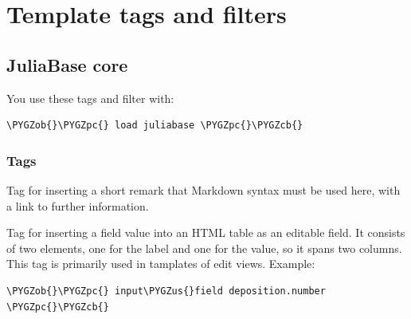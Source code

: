 \documentclass[a4paper,11pt,english]{sphinxmanual}
\def\PYGZus{\char`\_}
\def\PYGZob{\char`\{}
\def\PYGZcb{\char`\}}
\def\PYGZpc{\char`\%}
\begin{document}

\chapter{Template tags and filters}
\label{programming/template_tags_and_filters:index-0}\label{programming/template_tags_and_filters:template-tags-and-filters}\label{programming/template_tags_and_filters::doc}

\section{JuliaBase core}
\label{programming/template_tags_and_filters:juliabase-core}
You use these tags and filter with:

\begin{Verbatim}[commandchars=\\\{\},formatcom=\scriptsize]
\PYGZob{}\PYGZpc{} load juliabase \PYGZpc{}\PYGZcb{}
\end{Verbatim}


\subsection{Tags}
\label{programming/template_tags_and_filters:tags}

\begin{fulllineitems}
\label{programming/template_tags_and_filters:jb_common.templatetags.juliabase.markdown_hint}
Tag for inserting a short remark that Markdown syntax must be used
here, with a link to further information.

\end{fulllineitems}


\begin{fulllineitems}
\label{programming/template_tags_and_filters:jb_common.templatetags.juliabase.input_field}
Tag for inserting a field value into an HTML table as an editable
field.  It consists of two  elements, one for the label and one for
the value, so it spans two columns.  This tag is primarily used in
tamplates of edit views.  Example:

\begin{Verbatim}[commandchars=\\\{\},formatcom=\scriptsize]
\PYGZob{}\PYGZpc{} input\PYGZus{}field deposition.number \PYGZpc{}\PYGZcb{}
\end{Verbatim}

\end{fulllineitems}
\end{document}
